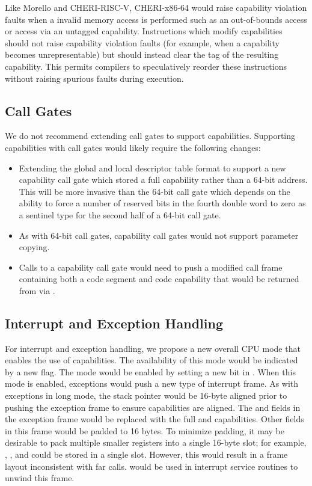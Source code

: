 Like Morello and CHERI-RISC-V, CHERI-x86-64 would
raise capability violation faults when a invalid memory access is
performed such as an out-of-bounds access or access via an untagged
capability.  Instructions which modify
capabilities should not raise capability violation faults (for
example, when a capability becomes unrepresentable) but should instead
clear the tag of the resulting capability.  This permits compilers to
speculatively reorder these instructions without raising spurious
faults during execution.

\subsection{Call Gates}

We do not recommend extending call gates to support capabilities.
Supporting capabilities with call gates would likely require the
following changes:

\begin{itemize}
  \item Extending the global and local descriptor table format to
    support a new capability call gate which stored a full capability
    rather than a 64-bit address.  This will be more invasive than the
    64-bit call gate which depends on the ability to force a number
    of reserved bits in the fourth double word to zero as a sentinel
    type for the second half of a 64-bit call gate.

  \item As with 64-bit call gates, capability call gates would not support
    parameter copying.

  \item Calls to a capability call gate would need to push a modified
    call frame containing both a code segment and code capability that
    would be returned from via .
\end{itemize}

\subsection{Interrupt and Exception Handling}
\label{sec:x86:interrupt-exception}

For interrupt and exception handling, we propose a new overall CPU
mode that enables the use of capabilities.  The availability of this
mode would be indicated by a new  flag.  The mode
would be enabled by setting a new bit in \CRFOUR{}.  When this mode is
enabled, exceptions would push a new type of interrupt frame.  As with
exceptions in long mode, the stack pointer would be 16-byte aligned
prior to pushing the exception frame to ensure capabilities are
aligned.  The \RIP{} and \RSP{} fields in the exception frame would be
replaced with the full \CIP{} and \CSP{} capabilities.  Other fields
in this frame would be padded to 16 bytes.  To minimize padding, it
may be desirable to pack multiple smaller registers into a single
16-byte slot; for example, \SS{}, \CS{}, and \RFLAGS{} could be stored
in a single slot.  However, this would result in a frame layout
inconsistent with far calls.   would be used in
interrupt service routines to unwind this frame.

